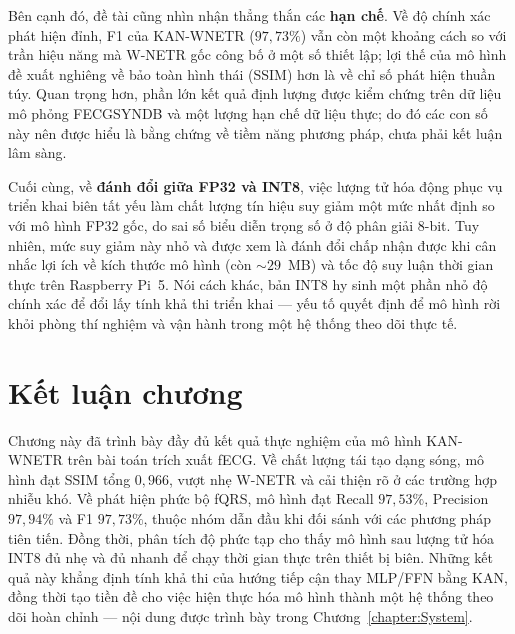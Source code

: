 \documentclass[../DoAn.tex]{subfiles}
\begin{document}
Bên cạnh đó, đề tài cũng nhìn nhận thẳng thắn các \textbf{hạn chế}. Về độ chính xác phát hiện đỉnh, F1 của KAN-WNETR ($97{,}73\%$) vẫn còn một khoảng cách so với trần hiệu năng mà W-NETR gốc công bố ở một số thiết lập; lợi thế của mô hình đề xuất nghiêng về bảo toàn hình thái (SSIM) hơn là về chỉ số phát hiện thuần túy. Quan trọng hơn, phần lớn kết quả định lượng được kiểm chứng trên dữ liệu mô phỏng FECGSYNDB và một lượng hạn chế dữ liệu thực; do đó các con số này nên được hiểu là bằng chứng về tiềm năng phương pháp, chưa phải kết luận lâm sàng.

Cuối cùng, về \textbf{đánh đổi giữa FP32 và INT8}, việc lượng tử hóa động phục vụ triển khai biên tất yếu làm chất lượng tín hiệu suy giảm một mức nhất định so với mô hình FP32 gốc, do sai số biểu diễn trọng số ở độ phân giải 8-bit. Tuy nhiên, mức suy giảm này nhỏ và được xem là đánh đổi chấp nhận được khi cân nhắc lợi ích về kích thước mô hình (còn $\sim$$29$~MB) và tốc độ suy luận thời gian thực trên Raspberry Pi~5. Nói cách khác, bản INT8 hy sinh một phần nhỏ độ chính xác để đổi lấy tính khả thi triển khai --- yếu tố quyết định để mô hình rời khỏi phòng thí nghiệm và vận hành trong một hệ thống theo dõi thực tế.

\section{Kết luận chương}

Chương này đã trình bày đầy đủ kết quả thực nghiệm của mô hình KAN-WNETR trên bài toán trích xuất fECG. Về chất lượng tái tạo dạng sóng, mô hình đạt SSIM tổng $0{,}966$, vượt nhẹ W-NETR và cải thiện rõ ở các trường hợp nhiễu khó. Về phát hiện phức bộ fQRS, mô hình đạt Recall $97{,}53\%$, Precision $97{,}94\%$ và F1 $97{,}73\%$, thuộc nhóm dẫn đầu khi đối sánh với các phương pháp tiên tiến. Đồng thời, phân tích độ phức tạp cho thấy mô hình sau lượng tử hóa INT8 đủ nhẹ và đủ nhanh để chạy thời gian thực trên thiết bị biên. Những kết quả này khẳng định tính khả thi của hướng tiếp cận thay MLP/FFN bằng KAN, đồng thời tạo tiền đề cho việc hiện thực hóa mô hình thành một hệ thống theo dõi hoàn chỉnh --- nội dung được trình bày trong Chương~\ref{chapter:System}.
\end{document}
